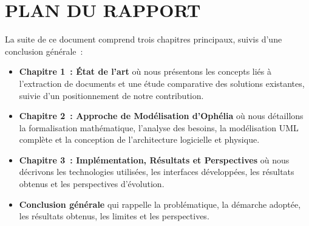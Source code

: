 \section*{\color{darkgray}PLAN DU RAPPORT }
La suite de ce document comprend trois chapitres principaux, suivis d'une conclusion générale~:
\begin{itemize}
\item \textbf{Chapitre 1~: État de l'art} où nous présentons les concepts liés à l'extraction de documents et une étude comparative des solutions existantes, suivie d'un positionnement de notre contribution.

\item \textbf{Chapitre 2~: Approche de Modélisation d'Ophélia} où nous détaillons la formalisation mathématique, l'analyse des besoins, la modélisation UML complète et la conception de l'architecture logicielle et physique.

\item \textbf{Chapitre 3~: Implémentation, Résultats et Perspectives} où nous décrivons les technologies utilisées, les interfaces développées, les résultats obtenus et les perspectives d'évolution.

\item \textbf{Conclusion générale} qui rappelle la problématique, la démarche adoptée, les résultats obtenus, les limites et les perspectives.
\end{itemize}